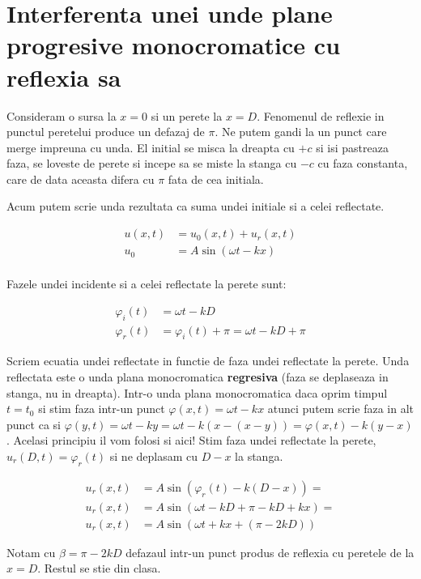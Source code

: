 \documentclass{article}
\begin{document}
\section{Interferenta unei unde plane progresive monocromatice cu reflexia sa}

Consideram o sursa la $x = 0$ si un perete la $x = D$. Fenomenul de reflexie in punctul peretelui produce un defazaj de $\pi$. Ne putem gandi la un punct care merge impreuna cu unda. El initial se misca la dreapta cu $+c$ si isi pastreaza faza, se loveste de perete si incepe sa se miste la stanga cu $-c$ cu faza constanta, care de data aceasta difera cu $\pi$ fata de cea initiala.

Acum putem scrie unda rezultata ca suma undei initiale si a celei reflectate.

\begin{align*}
    u(x, t) &= u_0(x,t) + u_r(x, t) \\
    u_0 &= A\sin(\omega t - kx) \\
\end{align*}

Fazele undei incidente si a celei reflectate la perete sunt:

\begin{align*}
    \varphi_i(t) &= \omega t - kD \\
    \varphi_r(t) &= \varphi_i(t) + \pi = \omega t - kD + \pi
\end{align*}

Scriem ecuatia undei reflectate in functie de faza undei reflectate la perete. Unda reflectata este o unda plana monocromatica \textbf{regresiva} (faza se deplaseaza in stanga, nu in dreapta). Intr-o unda plana monocromatica daca oprim timpul $t = t_0$ si stim faza intr-un punct $\varphi(x, t) = \omega t - kx$ atunci putem scrie faza in alt punct ca si $\varphi(y, t) = \omega t - ky = \omega t - k(x - (x - y)) = \varphi(x, t) - k(y - x)$. Acelasi principiu il vom folosi si aici! Stim faza undei reflectate la perete, $u_r(D, t) = \varphi_r(t)$ si ne deplasam cu $D - x$ la stanga.

\begin{align*}
    u_r(x, t) &= A\sin(\varphi_r(t) - k(D - x)) = \\
    u_r(x, t) &= A\sin(\omega t - kD + \pi - kD + kx) = \\
    u_r(x, t) &= A\sin(\omega t + kx + (\pi - 2kD))
\end{align*}

Notam cu $\beta = \pi - 2kD$ defazaul intr-un punct produs de reflexia cu peretele de la $x = D$. Restul se stie din clasa.
\end{document}
